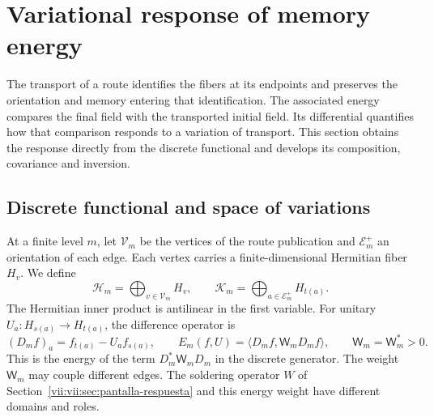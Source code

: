 
\section{Variational response of memory energy}
\label{vii:vii:sec:variacion-memoria}

The transport of a route identifies the fibers at its endpoints and preserves
the orientation and memory entering that identification. The associated
energy compares the final field with the transported initial field. Its
differential quantifies how that comparison responds to a variation of
transport. This section obtains the response directly from the discrete
functional and develops its composition, covariance and inversion.

\subsection{Discrete functional and space of variations}
\label{vii:vii:subsec:funcional-memoria}

At a finite level \(m\), let \(\mathcal V_m\) be the vertices of the
route publication and \(\mathcal E_m^+\) an orientation of each edge.
Each vertex carries a finite-dimensional Hermitian fiber \(H_v\).
We define
\[
 \mathcal H_m=\bigoplus_{v\in\mathcal V_m}H_v,\qquad
 \mathcal K_m=\bigoplus_{a\in\mathcal E_m^+}H_{t(a)}.
\]
The Hermitian inner product is antilinear in the first variable.
For unitary \(U_a:H_{s(a)}\to H_{t(a)}\), the difference operator is
\begin{equation}
 (D_mf)_a=f_{t(a)}-U_af_{s(a)},\qquad
 E_m(f,U)=\langle D_mf,\mathsf W_mD_mf\rangle,\qquad
 \mathsf W_m=\mathsf W_m^*>0.
 \label{vii:vii:eq:energia-memoria-discreta}
\end{equation}
This is the energy of the term \(D_m^*\mathsf W_mD_m\) in the discrete generator.
The weight \(\mathsf W_m\) may couple different edges. The soldering operator \(W\)
of Section~\ref{vii:vii:sec:pantalla-respuesta} and this energy
weight have different domains and roles.

